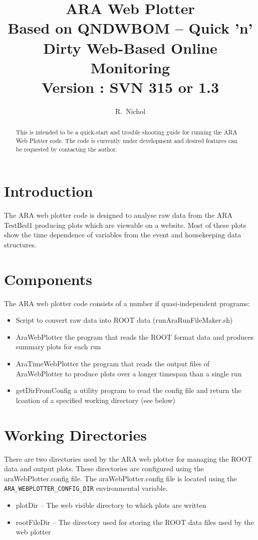 \documentclass[letterpaper]{article}  %
\begin{document}
\title{ARA Web Plotter \\ \small{Based on QNDWBOM -- Quick 'n' Dirty Web-Based Online Monitoring} \\ \small{Version : SVN 315 or 1.3}}   
\author{R.~Nichol}


\maketitle


\begin{abstract}
  This is intended to be a quick-start and trouble shooting guide for running the ARA Web Plotter code. The code is currently under development and desired features can be requested by contacting the author.
\end{abstract}

\section{Introduction}
The ARA web plotter code is designed to analyse raw data from the ARA TestBed1 producing plots which are viewable on a website. Most of these plots show the time dependence of variables from the event and housekeeping data structures.

\section{Components}
The ARA web plotter code consists of a number if quasi-independent programs:
\begin{itemize}
\item Script to convert raw data into ROOT data (runAraRunFileMaker.sh)
\item AraWebPlotter the program that reads the ROOT format data and produces summary plots for each run
\item AraTimeWebPlotter the program that reads the output files of AraWebPlotter to produce plots over a longer timespan than a single run
\item getDirFromConfig a utility program to read the config file and return the lcoation of a specified working directory (see below)
\end{itemize}


\section{Working Directories}\label{workdir}
There are two directories used by the ARA web plotter for managing the ROOT data and output plots. These directories are configured using the araWebPlotter.config file. The araWebPlotter.config file is located using the {\tt ARA\_WEBPLOTTER\_CONFIG\_DIR} environmental variable.
\begin{itemize}
\item plotDir -- The web visible directory to which plots are written
\item rootFileDir -- The directory used for storing the ROOT data files used by the web plotter
\end{itemize}
\end{document}
